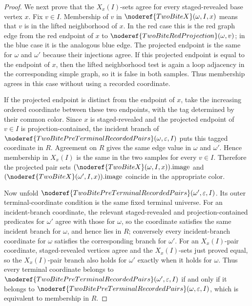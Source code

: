 \begin{proof}
We next prove that the \(X_x(I)\)-sets agree for every staged-revealed base
vertex \(x\).  Fix \(v\in I\).  Membership of \(v\) in
\(\noderef{TwoBiteX}(\omega,I,x)\) means that \(v\) is in the lifted
neighborhood of \(x\).  In the red case this is the red graph edge from the
red endpoint of \(x\) to \(\noderef{TwoBiteRedProjection}(\omega,v)\); in the
blue case it is the analogous blue edge.  The projected endpoint is the same
for \(\omega\) and \(\omega'\) because their injections agree.  If this
projected endpoint is equal to the endpoint of \(x\), then the lifted
neighborhood test is again a loop adjacency in the corresponding simple graph,
so it is false in both samples.  Thus membership agrees in this case without
using a recorded coordinate.

If the projected endpoint is distinct from the endpoint of \(x\), take the
increasing ordered coordinate between these two endpoints, with the tag
determined by their common color.  Since \(x\) is staged-revealed and the
projected endpoint of \(v\in I\) is projection-contained, the incident branch
of \(\noderef{TwoBitePreTerminalRecordedPairs}(\omega,\varepsilon,I)\) puts
this tagged coordinate in \(R\).  Agreement on \(R\) gives the same edge value
in \(\omega\) and \(\omega'\).  Hence membership in \(X_x(I)\) is the same in
the two samples for every \(v\in I\).  Therefore the projected pair sets
\((\noderef{TwoBiteX}(\omega,I,x)).\mathrm{image}\) and
\((\noderef{TwoBiteX}(\omega',I,x)).\mathrm{image}\) coincide in the
appropriate color.

Now unfold
\(\noderef{TwoBitePreTerminalRecordedPairs}(\omega',\varepsilon,I)\).  Its
outer terminal-coordinate condition is the same fixed terminal universe.  For
an incident-branch coordinate, the relevant staged-revealed and
projection-contained predicates for \(\omega'\) agree with those for
\(\omega\), so the coordinate satisfies the same incident branch for
\(\omega\), and hence lies in \(R\); conversely every incident-branch
coordinate for \(\omega\) satisfies the corresponding branch for \(\omega'\).
For an \(X_x(I)\)-pair coordinate, staged-revealed vertices agree and the
\(X_x(I)\)-sets just proved equal, so the \(X_x(I)\)-pair branch also holds
for \(\omega'\) exactly when it holds for \(\omega\).  Thus every terminal
coordinate belongs to
\(\noderef{TwoBitePreTerminalRecordedPairs}(\omega',\varepsilon,I)\) if and
only if it belongs to
\(\noderef{TwoBitePreTerminalRecordedPairs}(\omega,\varepsilon,I)\), which is
equivalent to membership in \(R\).
\end{proof}
